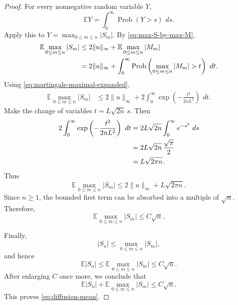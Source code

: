 \documentclass[11pt,a4paper]{amsart}
\theoremstyle{definition}
\theoremstyle{remark}
\numberwithin{equation}{section}
\newcommand{\EE}{\mathbb E}
\newcommand{\Prob}{\operatorname{Prob}}
\newcommand{\dd}{\,d}
\newcommand{\1}{\boldsymbol 1}
\begin{document}
\begin{proof}
For every nonnegative random variable $Y$,
\begin{equation}\label{eq:tail-integral-identity}
 \EE Y
 =
 \int_0^\infty\Prob(Y>s)\,\dd s.
\end{equation}
Apply this to $Y=\max_{0\le m\le n}|S_m|$.
By \eqref{eq:max-S-by-max-M},
\begin{align}
 \EE\max_{0\le m\le n}|S_m|
 &\le
 2\|u\|_\infty
 +
 \EE\max_{0\le m\le n}|M_m|
 \notag\\
 &=
 2\|u\|_\infty
 +
 \int_0^\infty
 \Prob\left(
   \max_{0\le m\le n}|M_m|>t
 \right)
 \,\dd t.
\end{align}
Using \eqref{eq:martingale-maximal-expanded},
\begin{align}
 \EE\max_{0\le m\le n}|S_m|
 &\le
 2\|u\|_\infty
 +
 2\int_0^\infty
 \exp\left(
   -\frac{t^2}{2nL^2}
 \right)
 \,\dd t.
 \label{eq:S-maximal-expectation-integral}
\end{align}
Make the change of variables $t=L\sqrt{2n}\,s$.
Then
\begin{align}
 2\int_0^\infty
 \exp\left(
   -\frac{t^2}{2nL^2}
 \right)
 \,\dd t
 &=
 2L\sqrt{2n}
 \int_0^\infty e^{-s^2}\,\dd s
 \notag\\
 &=
 2L\sqrt{2n}\,\frac{\sqrt\pi}{2}
 \notag\\
 &=
 L\sqrt{2\pi n}.
\end{align}
Thus
$$
 \EE\max_{0\le m\le n}|S_m|
 \le
 2\|u\|_\infty+L\sqrt{2\pi n}.
$$
Since $n\ge1$, the bounded first term can be absorbed into a multiple of $\sqrt n$.  Therefore,
\begin{equation}\label{eq:S-maximal-mean}
 \EE\max_{0\le m\le n}|S_m|
 \le C\sqrt n.
\end{equation}

Finally,
$$
 |S_n|
 \le
 \max_{0\le m\le n}|S_m|,
$$
and hence
$$
 \EE|S_n|
 \le
 \EE\max_{0\le m\le n}|S_m|
 \le C\sqrt n.
$$
After enlarging $C$ once more, we conclude that
$$
 \EE|S_n|
 +
 \EE\max_{0\le m\le n}|S_m|
 \le C\sqrt n.
$$
This proves \eqref{eq:diffusion-mean}.
\end{proof}

\end{document}
